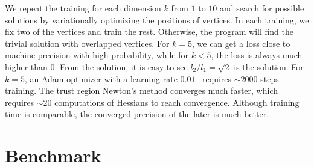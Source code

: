 \documentclass{article}
\newcommand{\<}{\langle}
\renewcommand{\>}{\rangle}
\theoremstyle{definition}\newtheorem{definition}{\textit{Definition}}
\begin{document}
We repeat the training for each dimension $k$ from $1$ to $10$ and search for possible solutions by variationally optimizing the positions of vertices.
In each training, we fix two of the vertices and train the rest. Otherwise, the program will find the trivial solution with overlapped vertices. 
For $k=5$, we can get a loss close to machine precision with high probability, while for $k < 5$, the loss is always much higher than $0$.
From the solution, it is easy to see $l_2/l_1 = \sqrt{2}$ is the solution.
For $k=5$, an Adam optimizer with a learning rate $0.01$~\cite{Kingma2014} requires $\sim2000$ steps training.
The trust region Newton's method converges much faster, which requires $\sim 20$ computations of Hessians to reach convergence.
Although training time is comparable, the converged precision of the later is much better.

\section{Benchmark}\label{sec:benchmark}
\end{document}
